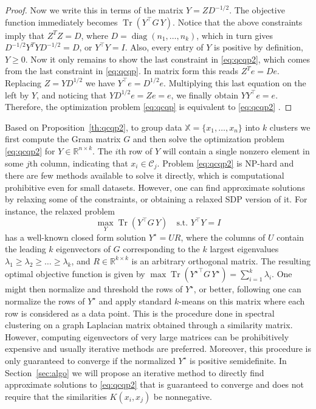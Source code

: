 \documentclass[aps,preprint,nofootinbib,floatfix]{revtex4-1}
\DeclareMathOperator{\diag}{diag}
\DeclareMathOperator{\Tr}{Tr}
\newcommand\kk{K}
\newcommand\C{{\mathcal{C}}}
\newcommand\Zt{Y}
\newcommand\e{e}
\begin{document}
\begin{proof}
Now we write this in terms of the matrix $Y = Z D^{-1/2}$.
The objective function immediately becomes
$\Tr\left( Y^\top G \, Y\right)$. Notice that the above constraints
imply that $Z^T Z = D$, where $D=\diag(n_1,\dotsc,n_k)$, which in turn gives
$D^{-1/2} Y^T Y D^{-1/2} = D$, or $Y^\top Y = I$. 
Also, every entry of $Y$ is positive by definition,
$Y \ge 0$. Now it only remains to show the last 
constraint in \eqref{eq:qcqp2}, which comes from the last
constraint in \eqref{eq:qcqp}. In matrix form this reads
$Z^T \e = D \e$. Replacing $Z=YD^{1/2}$ we have
$Y^\top \e = D^{1/2} \e$. Multiplying this last equation
on the left by $Y$, and noticing
that $Y D^{1/2} \e = Z \e = \e$, we finally obtain
$Y Y^\top \e = \e$. Therefore, the optimization 
problem \eqref{eq:qcqp} is equivalent
to \eqref{eq:qcqp2} .
\end{proof}


Based on Proposition~\ref{th:qcqp2}, to group data
$\mathbb{X} = \{ x_1,\dotsc,x_n \}$
into  $k$ clusters we first compute the Gram matrix
$G$ and then 
solve the optimization problem \eqref{eq:qcqp2} for $\Zt \in
\mathbb{R}^{n\times k}$. The $i$th row
of $\Zt$ will contain a single nonzero element in some $j$th column,
indicating that $x_i \in \C_j$. 
Problem \eqref{eq:qcqp2} is NP-hard and there
are few methods
available to solve it directly,
which is computational prohibitive even for small datasets.
However, one can find approximate solutions by relaxing some 
of the constraints, or obtaining a relaxed SDP version of it.
For instance, the relaxed problem
\begin{equation}
\max_{Y} \Tr \left( Y^\top G \, Y \right) \quad \mbox{s.t. $Y^\top Y = I$}
\end{equation}
has a well-known closed form solution $Y^\star = U R$, where the
columns of $U$ contain the leading $k$ eigenvectors of $G$ corresponding
to the $k$ largest eigenvalues $\lambda_1\ge \lambda_2\ge\dotsc\ge\lambda_k$, 
and
$R \in \mathbb{R}^{k\times k}$ is an arbitrary orthogonal matrix. 
The resulting
optimal objective function is given by
$\max \Tr \left( {Y^\star}^\top G \, Y^\star \right)  = 
\sum_{i=1}^k \lambda_i$. One might then normalize and threshold the rows
of $Y^\star$, or better, following \cite{NgJordan} one can normalize the
rows of $Y^\star$ and apply standard $k$-means on this matrix where each
row is considered as a data point.
This is the procedure done in spectral clustering on a graph Laplacian
matrix obtained through a similarity matrix.
However, computing eigenvectors of very large matrices
can be prohibitively expensive 
and usually iterative methods are preferred. Moreover,
this procedure is only guaranteed to converge if the normalized $Y^\star$ is
positive semidefinite.
In Section~\ref{sec:algo} we will propose an iterative method to directly 
find approximate solutions to \eqref{eq:qcqp2} that is guaranteed to
converge and does not require that the similarities $\kk(x_i,x_j)$ be
nonnegative.
\end{document}
